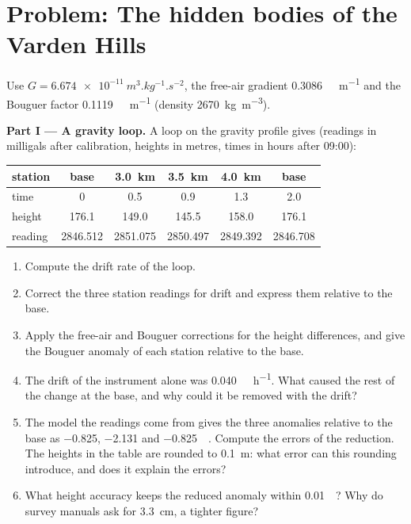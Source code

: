 \section{Problem: The hidden bodies of the Varden Hills}

\begin{problem}
\label{pb:b3:field-lab-methods-3:1}
Use $G = \qty{6.674e-11}{m^3.kg^{-1}.s^{-2}}$, the free-air gradient
\qty{0.3086}{\milli\gal.m^{-1}} and the Bouguer factor
\qty{0.1119}{\milli\gal.m^{-1}} (density \qty{2670}{kg.m^{-3}}).

\medskip\noindent\textbf{Part I --- A gravity loop.} A loop on the
gravity profile gives (readings in milligals after calibration, heights
in metres, times in hours after 09:00):
\begin{center}
\small
\begin{tabular}{lccccc}
\hline
station & base & \qty{3.0}{km} & \qty{3.5}{km} & \qty{4.0}{km} & base \\
\hline
time & 0 & 0.5 & 0.9 & 1.3 & 2.0 \\
height & 176.1 & 149.0 & 145.5 & 158.0 & 176.1 \\
reading & 2846.512 & 2851.075 & 2850.497 & 2849.392 & 2846.708 \\
\hline
\end{tabular}
\end{center}
\begin{enumerate}
\item Compute the drift rate of the loop.
\item Correct the three station readings for drift and express them
  relative to the base.
\item Apply the free-air and Bouguer corrections for the height
  differences, and give the Bouguer anomaly of each station relative to
  the base.
\item The drift of the instrument alone was \qty{0.040}{\milli\gal.h^{-1}}.
  What caused the rest of the change at the base, and why could it be
  removed with the drift?
\item The model the readings come from gives the three anomalies
  relative to the base as \num{-0.825}, \num{-2.131} and
  \qty{-0.825}{\milli\gal}. Compute the errors of the reduction. The
  heights in the table are rounded to \qty{0.1}{m}: what error can this
  rounding introduce, and does it explain the errors?
\item What height accuracy keeps the reduced anomaly within
  \qty{0.01}{\milli\gal}? Why do survey manuals ask for
  \qty{3.3}{cm}, a tighter figure?
\end{enumerate}


\end{problem}
